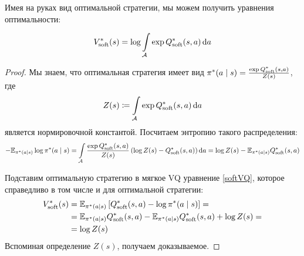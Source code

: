 


Имея на руках вид оптимальной стратегии, мы можем получить уравнения оптимальности:

\begin{theorem}
\begin{equation}\label{softV*Q*}
V^*_{\mathrm{soft}}(s) = \log \int\limits_{\mathcal{A}} \exp Q^*_{\mathrm{soft}}(s, a) \mathop{}\!\mathrm{d} a
\end{equation}
\begin{proof}
Мы знаем, что оптимальная стратегия имеет вид $\pi^*(a \mid s) \HM= \frac{\exp{Q^*_{\soft}(s, a)}}{Z(s)}$, где
$$Z(s) \coloneqq \int\limits_{\mathcal{A}} \exp Q^*_{\mathrm{soft}}(s, a) \mathop{}\!\mathrm{d} a$$
является нормировочной константой. Посчитаем энтропию такого распределения:
$$-\mathbb{E}_{\pi^*(a \mid s)} \log \pi^*(a \mid s) = \int\limits_{\mathcal{A}} \frac{\exp{Q^*_{\mathrm{soft}}(s, a)}}{Z(s)} \left(\log Z(s) - Q^*_{\mathrm{soft}}(s, a) \right) \mathop{}\!\mathrm{d} a = \log Z(s) - \mathbb{E}_{\pi^*(a \mid s)} Q^*_{\mathrm{soft}}(s, a)$$

Подставим оптимальную стратегию в мягкое VQ уравнение \eqref{softVQ}, которое справедливо в том числе и для оптимальной стратегии:
\begin{align*}
V^*_{\mathrm{soft}}(s) &= \mathbb{E}_{\pi^*(a \mid s)} \left[ Q^*_{\mathrm{soft}}(s, a) - \log \pi^*(a \mid s) \right] = \\ &= \mathbb{E}_{\pi^*(a \mid s)} Q^*_{\mathrm{soft}}(s, a) - \mathbb{E}_{\pi^*(a \mid s)} Q^*_{\mathrm{soft}}(s, a) + \log Z(s) = \\ &= \log Z(s)
\end{align*}
Вспоминая определение $Z(s)$, получаем доказываемое.
\end{proof}
\end{theorem}

